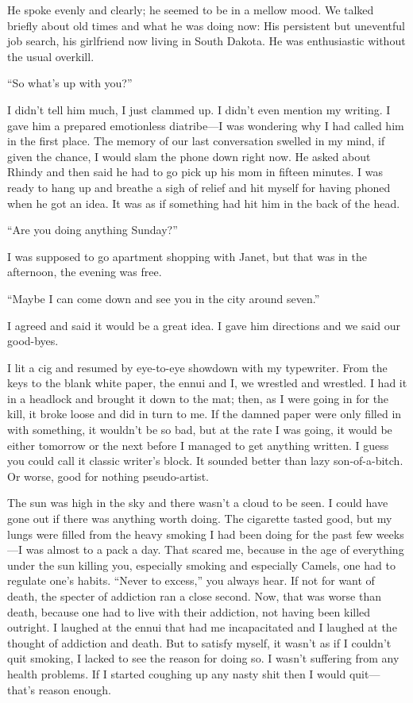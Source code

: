 He spoke evenly and clearly; he seemed to be in a mellow mood. We talked
briefly about old times and what he was doing now: His persistent but
uneventful job search, his girlfriend now living in South Dakota. He was
enthusiastic without the usual overkill.

``So what's up with you?''

I didn't tell him much, I just clammed up. I didn't even mention my
writing. I gave him a prepared emotionless diatribe---I was wondering
why I had called him in the first place. The memory of our last
conversation swelled in my mind, if given the chance, I would slam the
phone down right now. He asked about Rhindy and then said he had to go
pick up his mom in fifteen minutes. I was ready to hang up and breathe a
sigh of relief and hit myself for having phoned when he got an idea. It
was as if something had hit him in the back of the head.

``Are you doing anything Sunday?''

I was supposed to go apartment shopping with Janet, but that was in the
afternoon, the evening was free.

``Maybe I can come down and see you in the city around seven.''

I agreed and said it would be a great idea. I gave him directions and we
said our good-byes.

I lit a cig and resumed by eye-to-eye showdown with my typewriter. From
the keys to the blank white paper, the ennui and I, we wrestled and
wrestled. I had it in a headlock and brought it down to the mat; then,
as I were going in for the kill, it broke loose and did in turn to me.
If the damned paper were only filled in with something, it wouldn't be
so bad, but at the rate I was going, it would be either tomorrow or the
next before I managed to get anything written. I guess you could call it
classic writer's block. It sounded better than lazy son-of-a-bitch. Or
worse, good for nothing pseudo-artist.

The sun was high in the sky and there wasn't a cloud to be seen. I could
have gone out if there was anything worth doing. The cigarette tasted
good, but my lungs were filled from the heavy smoking I had been doing
for the past few weeks---I was almost to a pack a day. That scared me,
because in the age of everything under the sun killing you, especially
smoking and especially Camels, one had to regulate one's habits. ``Never
to excess,'' you always hear. If not for want of death, the specter of
addiction ran a close second. Now, that was worse than death, because
one had to live with their addiction, not having been killed outright. I
laughed at the ennui that had me incapacitated and I laughed at the
thought of addiction and death. But to satisfy myself, it wasn't as if I
couldn't quit smoking, I lacked to see the reason for doing so. I wasn't
suffering from any health problems. If I started coughing up any nasty
shit then I would quit---that's reason enough.

